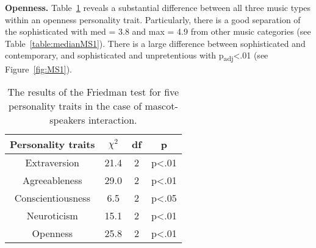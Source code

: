 \par\textbf{Openness.}
Table~\ref{table:friedmanMS1} reveals a substantial difference between all three music types
within an openness personality trait.
Particularly, there is a good separation of the sophisticated with med = 3.8 and max = 4.9
from other music categories (see Table~\ref{table:medianMS1}).
There is a large difference between sophisticated and contemporary, and sophisticated
and unpretentious with p\textsubscript{adj}<.01 (see Figure~\ref{fig:MS1}).

\begin{table}[hbt!]
    \renewcommand{\arraystretch}{1}
    \begin{center}
        \begin{tabular}{|c|c|c|c|}
            \hline
            \textbf{Personality traits} & \textbf{$\chi^2$} & \textbf{df} & \textbf{p} \\
            \hline
            Extraversion &21.4 &2 &p<.01 \\
            \hline
            Agreeableness &29.0 &2 &p<.01\\
            \hline
            Conscientiousness &6.5 &2 &p<.05\\
            \hline
            Neuroticism &15.1 &2 &p<.01 \\
            \hline
            Openness &25.8 &2 &p<.01 \\
            \hline
        \end{tabular}
        \caption{The results of the Friedman test for five personality traits in the case of mascot-speakers interaction.}
        \label{table:friedmanMS1}
    \end{center}
\end{table}

